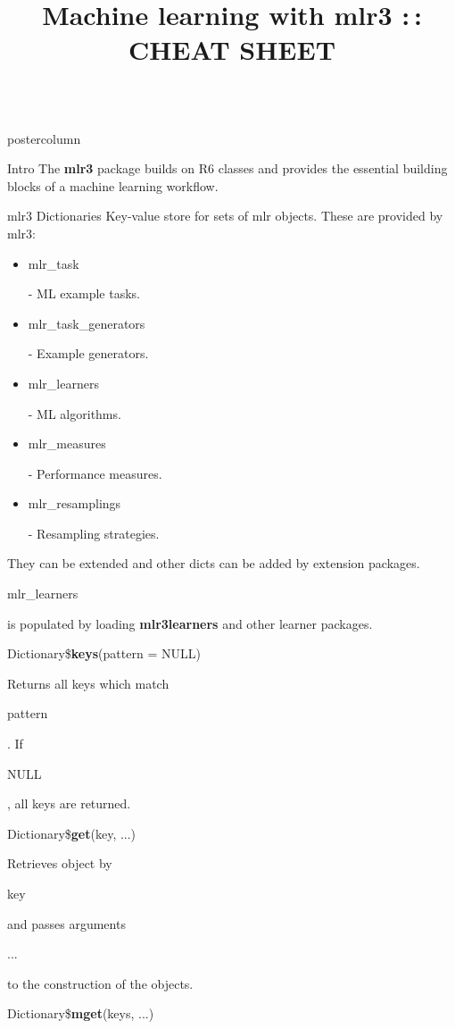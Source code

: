 \documentclass{beamer}
\title{Machine learning with mlr3 :\,: CHEAT SHEET} %
\newlength{\columnheight} %
\newcommand{\codeinline}[1]{\begin{codeboxinline}#1\end{codeboxinline}}
\begin{document}
\begin{frame}[fragile]{}
	\begin{columns}
		\begin{column}{.245\textwidth}
			\begin{beamercolorbox}[center]{postercolumn}
				\begin{minipage}{.98\textwidth}
					\parbox[t][\columnheight]{\textwidth}{
						\begin{myblock}{Intro}
							The \textbf{mlr3} package builds on R6 classes and provides the essential building
							blocks of a machine learning workflow.
						\end{myblock}
						\begin{myblock}{mlr3 Dictionaries}
                            Key-value store for sets of mlr objects. These are provided by mlr3: 
							\\
							\begin{itemize}
								\item \codeinline{mlr\_task} - ML example tasks.
								\item \codeinline{mlr\_task\_generators} - Example generators.
                                \item \codeinline{mlr\_learners} - ML algorithms. 
								\item \codeinline{mlr\_measures} - Performance measures.
								\item \codeinline{mlr\_resamplings} - Resampling strategies.
							\end{itemize}
                            They can be extended and other dicts can be added by extension packages.
                            \codeinline{mlr\_learners} is populated by loading \textbf{mlr3learners} and other learner packages.
							\vspace{1em}		
							\begin{codebox}
								Dictionary\$\textbf{keys}(pattern = NULL)
							\end{codebox}
							Returns all keys which match \codeinline{pattern}. 
							If \codeinline{NULL}, all keys are returned. 
							\\
							\begin{codebox}
								Dictionary\$\textbf{get}(key, ...)
							\end{codebox}
							Retrieves object by \codeinline{key} and 
							passes arguments \codeinline{...} to the construction of the objects.\\
							\begin{codebox}
								Dictionary\$\textbf{mget}(keys, ...)

\end{codebox}
\end{myblock}}
\end{minipage}
\end{beamercolorbox}
\end{column}
\end{columns}
\end{frame}
\end{document}
